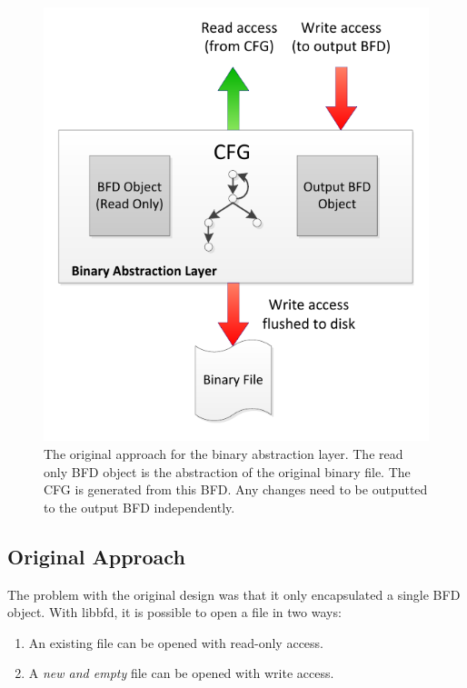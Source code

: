 \begin{figure}[H]
 \centering
 \includegraphics[scale=0.86]{Binary_Abstraction_Layer_Attempt1.pdf}
 \caption{The original approach for the binary abstraction layer. The read only BFD object is the abstraction of the original binary file. The CFG is generated from this BFD. Any changes need to be outputted to the output BFD independently.}
\label{fig:BAL_Attempt1}
\end{figure}

\subsection{Original Approach}

The problem with the original design was that it only encapsulated a single BFD object. With libbfd, it is possible to open a file in two ways:

\begin{enumerate}
\item An existing file can be opened with read-only access.
\item A \emph{new and empty} file can be opened with write access.
\end{enumerate}

